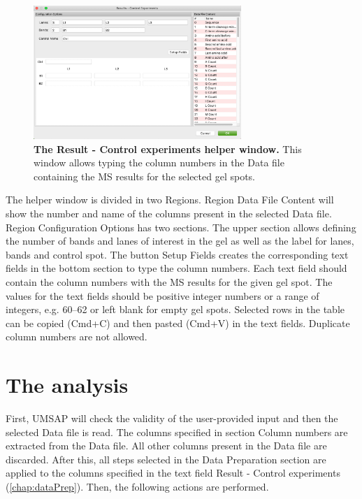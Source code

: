 \begin{figure}[h]
    \centering
    \includegraphics[width=0.7\textwidth]{./IMAGES/MOD-LIMPROT/limprot-rescontrol.jpg}
    \caption[The Result - Control experiments helper window]{\textbf{The Result -
    Control experiments helper window.} This window allows typing the column
    numbers in the Data file containing the MS results for the selected gel spots.} 
    \label{fig:limprotResControlWindow}
    \vspace{-5pt} 	
\end{figure}

The helper window is divided in two Regions. Region Data File Content will show the 
number and name of the columns present in the selected Data file. Region
Configuration Options has two sections. The upper section allows defining the number
of bands and lanes of interest in the gel as well as the label for lanes, bands and
control spot. The button Setup Fields creates the corresponding text fields in the
bottom section to type the column numbers. Each text field should contain the column
numbers with the MS results for the given gel spot. The values for the text fields
should be positive integer numbers or a range of integers, e.g. 
\numrange[range-phrase=--]{60}{62} or left blank for empty gel spots. Selected rows
in the table can be copied (Cmd+C) and then pasted (Cmd+V) in the text fields. 
Duplicate column numbers are not allowed. 

\section{The analysis}
\label{sec:limprotEquivalenceTest}
First, UMSAP will check the validity of the user-provided input and then the selected
Data file is read. The columns specified in section Column numbers are extracted
from the Data file. All other columns present in the Data file are discarded. After
this, all steps selected in the Data Preparation section are applied to the columns
specified in the text field Result - Control experiments (\autoref{chap:dataPrep}).
Then, the following actions are performed.

